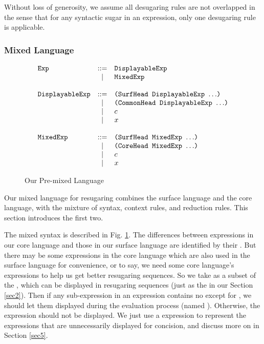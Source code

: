
Without loss of generosity, we assume all desugaring rules are not overlapped in the sense that for any syntactic sugar in an expression, only one desugaring rule is applicable.


\subsubsection{Mixed Language}
\begin{figure}[t]
\begin{centering}
{\footnotesize
\[
			\begin{array}{lcl}
			\mbox{\tt Exp} &::=& \mbox{\tt DisplayableExp}\\
			&|& \mbox{\tt MixedExp}\\
			\\
			\mbox{\tt DisplayableExp} &::=& \mbox{\tt (SurfHead~DisplayableExp~$\ldots$)}\\
			&|& \mbox{\tt (CommonHead~DisplayableExp~$\ldots$)}\\
			&|& c\\
			&|& x\\
			\\
			\mbox{\tt MixedExp} &::=& \mbox{\tt (SurfHead~MixedExp~$\ldots$)}\\
			&|& \mbox{\tt (CoreHead~MixedExp~$\ldots$)}\\
			&|& c\\
			&|& x\\
			\end{array}
			\]
}

\end{centering}
\caption{Our Pre-mixed Language}
\label{fig:mix}
\end{figure}

Our mixed language for resugaring combines the surface language and the core language, with the mixture of syntax, context rules, and reduction rules. This section introduces the first two.

The mixed syntax is described in Fig.  \ref{fig:mix}.
%
The differences between expressions in our core language and those in our surface language are identified by their . But there may be some expressions in the core language which are also used in the surface language for convenience, or to say, we need some core language's expressions to help us get better resugaring sequences. So we take  as a subset of the , which can be displayed in resugaring sequences (just as the  in our Section \ref{sec2}). Then if any sub-expression in an expression contains no  except for , we should let them displayed during the evaluation process (named ). Otherwise, the expression should not be displayed. We just use a  expression to represent the expressions that are unnecessarily displayed for concision, and discuss more on   in Section \ref{sec5}.

